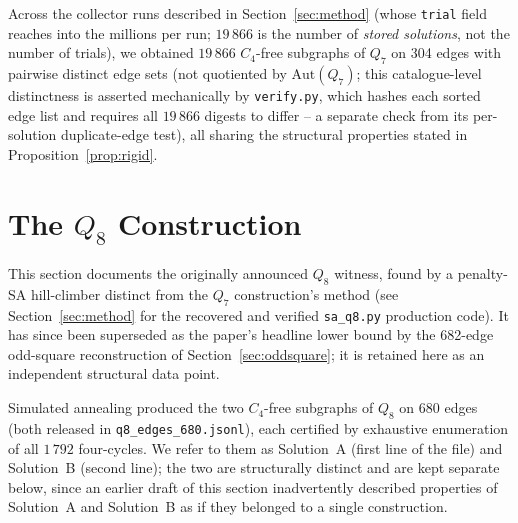 \documentclass[12pt,a4paper]{article}
\theoremstyle{definition}
\begin{document}
Across the collector runs described in Section~\ref{sec:method} (whose
\texttt{trial} field reaches into the millions per run; $19\,866$ is
the number of \emph{stored solutions}, not the number of trials),
we obtained $19\,866$ $C_4$-free subgraphs of $Q_7$ on 304 edges with
pairwise distinct edge sets (not quotiented by $\mathrm{Aut}(Q_7)$; this
catalogue-level distinctness is asserted mechanically by \texttt{verify.py},
which hashes each sorted edge list and requires all $19\,866$ digests to
differ -- a separate check from its per-solution duplicate-edge test),
all sharing the structural properties stated in Proposition~\ref{prop:rigid}.

\section{The \texorpdfstring{$Q_8$}{Q8} Construction}\label{sec:q8}

This section documents the originally announced $Q_8$ witness, found by
a penalty-SA hill-climber distinct from the $Q_7$ construction's
method (see Section~\ref{sec:method} for the recovered and verified
\texttt{sa\_q8.py} production code). It has since been
superseded as the paper's headline lower bound by the 682-edge odd-square
reconstruction of Section~\ref{sec:oddsquare}; it is retained here as an
independent structural data point.

Simulated annealing produced the two $C_4$-free subgraphs of $Q_8$ on 680
edges (both released in \texttt{q8\_edges\_680.jsonl}), each certified by
exhaustive enumeration of all $1\,792$ four-cycles. We refer to them as
Solution~A (first line of the file) and Solution~B (second line); the
two are structurally distinct and are kept separate below, since an
earlier draft of this section inadvertently described properties of
Solution~A and Solution~B as if they belonged to a single construction.
\end{document}
